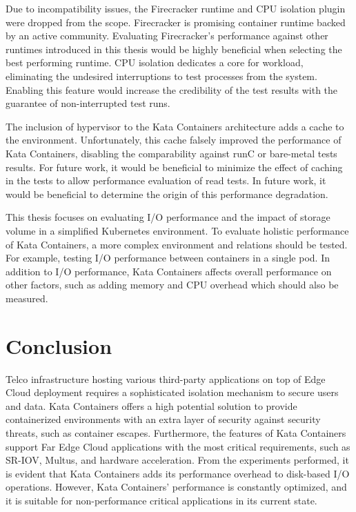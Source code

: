Due to incompatibility issues, the Firecracker runtime and CPU isolation plugin were dropped from the scope. Firecracker is promising container runtime backed by an active community. Evaluating Firecracker's performance against other runtimes introduced in this thesis would be highly beneficial when selecting the best performing runtime. CPU isolation dedicates a core for workload, eliminating the undesired interruptions to test processes from the system. Enabling this feature would increase the credibility of the test results with the guarantee of non-interrupted test runs.

The inclusion of hypervisor to the Kata Containers architecture adds a cache to the environment. Unfortunately, this cache falsely improved the performance of Kata Containers, disabling the comparability against runC or bare-metal tests results. For future work, it would be beneficial to minimize the effect of caching in the tests to allow performance evaluation of read tests. In future work, it would be beneficial to determine the origin of this performance degradation.

This thesis focuses on evaluating I/O performance and the impact of storage volume in a simplified Kubernetes environment. To evaluate holistic performance of Kata Containers, a more complex environment and relations should be tested. For example, testing I/O performance between containers in a single pod. In addition to I/O performance, Kata Containers affects overall performance on other factors, such as adding memory and CPU overhead which should also be measured.

\section{Conclusion}

Telco infrastructure hosting various third-party applications on top of Edge Cloud deployment requires a sophisticated isolation mechanism to secure users and data. Kata Containers offers a high potential solution to provide containerized environments with an extra layer of security against security threats, such as container escapes. Furthermore, the features of Kata Containers support Far Edge Cloud applications with the most critical requirements, such as SR-IOV, Multus, and hardware acceleration. From the experiments performed, it is evident that Kata Containers adds its performance overhead to disk-based I/O operations. However, Kata Containers' performance is constantly optimized, and it is suitable for non-performance critical applications in its current state.